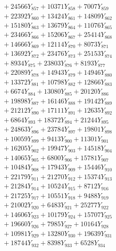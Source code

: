 \documentclass[a4paper,10pt]{article}
\begin{document}
{\begin{align}
&\;  + 24566 Y_{857} + 10371 Y_{858} + 7007 Y_{859} \\[0.3ex]
&\;  + 22392 Y_{860} + 13424 Y_{861} + 14809 Y_{862} \\[0.3ex]
&\;  + 15180 Y_{863} + 13679 Y_{864} + 11076 Y_{865} \\[0.3ex]
&\;  + 23466 Y_{866} + 15206 Y_{867} + 25414 Y_{868} \\[0.5ex]\allowbreak
&\;  + 14666 Y_{869} + 12114 Y_{870} + 8073 Y_{871} \\[0.3ex]
&\;  + 13692 Y_{872} + 23476 Y_{873} + 25153 Y_{874} \\[0.3ex]
&\;  + 8934 Y_{875} + 23803 Y_{876} + 8193 Y_{877} \\[0.3ex]
&\;  + 22089 Y_{878} + 14943 Y_{879} + 14946 Y_{880} \\[0.3ex]
&\;  + 13372 Y_{881} + 10798 Y_{882} + 12866 Y_{883} \\[0.3ex]
&\;  + 6674 Y_{884} + 13080 Y_{885} + 20120 Y_{886} \\[0.3ex]
&\;  + 19898 Y_{887} + 16146 Y_{888} + 19142 Y_{889} \\[0.3ex]
&\;  + 21212 Y_{890} + 17111 Y_{891} + 12635 Y_{892} \\[0.3ex]
&\;  + 6864 Y_{893} + 18372 Y_{894} + 21244 Y_{895} \\[0.3ex]
&\;  + 24863 Y_{896} + 23784 Y_{897} + 19801 Y_{898} \\[0.5ex]\allowbreak
&\;  + 10059 Y_{899} + 9413 Y_{900} + 11301 Y_{901} \\[0.3ex]
&\;  + 16205 Y_{902} + 19947 Y_{903} + 14518 Y_{904} \\[0.3ex]
&\;  + 14065 Y_{905} + 6800 Y_{906} + 15781 Y_{907} \\[0.3ex]
&\;  + 10484 Y_{908} + 17943 Y_{909} + 15446 Y_{910} \\[0.3ex]
&\;  + 22179 Y_{911} + 21270 Y_{912} + 15374 Y_{913} \\[0.3ex]
&\;  + 21284 Y_{914} + 10524 Y_{915} + 8712 Y_{916} \\[0.3ex]
&\;  + 21725 Y_{917} + 10551 Y_{918} + 9488 Y_{919} \\[0.3ex]
&\;  + 21002 Y_{920} + 6483 Y_{921} + 25277 Y_{922} \\[0.3ex]
&\;  + 14606 Y_{923} + 10179 Y_{924} + 15707 Y_{925} \\[0.3ex]
&\;  + 19660 Y_{926} + 7985 Y_{927} + 10164 Y_{928} \\[0.5ex]\allowbreak
&\;  + 10981 Y_{929} + 13280 Y_{930} + 19639 Y_{931} \\[0.3ex]
&\;  + 18744 Y_{932} + 8398 Y_{933} + 6528 Y_{934} \\[0.3ex]

\end{align}}
\end{document}
